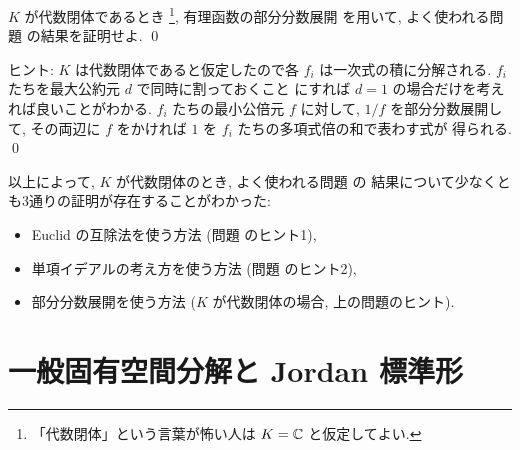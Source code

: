 \documentclass[12pt,twoside]{jarticle}
\begin{document}

\begin{question}
  $K$ が代数閉体であるとき%
  \footnote{「代数閉体」という言葉が怖い人は $K={\mathbb C}$ と仮定してよい.},
  有理函数の部分分数展開  を用いて,
  よく使われる問題  の結果を証明せよ.
  \qed
\end{question}

\noindent
ヒント: $K$ は代数閉体であると仮定したので各 $f_i$ は一次式の積に分解される.
$f_i$ たちを最大公約元 $d$ で同時に割っておくこと
にすれば $d=1$ の場合だけを考えれば良いことがわかる.
$f_i$ たちの最小公倍元 $f$ に対して, $1/f$ を部分分数展開して, 
その両辺に $f$ をかければ $1$ を $f_i$ たちの多項式倍の和で表わす式が
得られる.
\qed

\bigskip

以上によって, $K$ が代数閉体のとき, 
よく使われる問題  の
結果について少なくとも3通りの証明が存在することがわかった:
\begin{itemize}
\item Euclid の互除法を使う方法
  (問題  のヒント1),
\item 単項イデアルの考え方を使う方法
  (問題  のヒント2),
\item 部分分数展開を使う方法
  ($K$ が代数閉体の場合, 上の問題のヒント).
\end{itemize}


\section{一般固有空間分解と Jordan 標準形}
\label{sec:Jordan-nilpotent}
\end{document}
